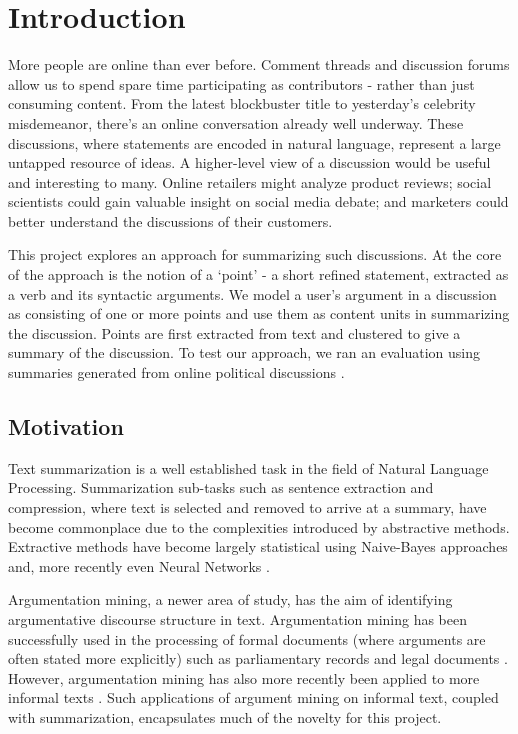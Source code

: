 \chapter{Introduction\label{chap:introduction}}
  More people are online than ever before. Comment threads and discussion forums allow us to spend spare time participating as contributors - rather than just consuming content. From the latest blockbuster title to yesterday's celebrity misdemeanor, there's an online conversation already well underway. These discussions, where statements are encoded in natural language, represent a large untapped resource of ideas. A higher-level view of a discussion would be useful and interesting to many. Online retailers might analyze product reviews; social scientists could gain valuable insight on social media debate; and marketers could better understand the discussions of their customers.

  This project explores an approach for summarizing such discussions. At the core of the approach is the notion of a `point' - a short refined statement, extracted as a verb and its syntactic arguments. We model a user's argument in a discussion as consisting of one or more points and use them as content units in summarizing the discussion. Points are first extracted from text and clustered to give a summary of the discussion. To test our approach, we ran an evaluation using summaries generated from online political discussions \cite{walker2012corpus}.

  \section{Motivation}
    Text summarization is a well established task in the field of Natural Language Processing. Summarization sub-tasks such as sentence extraction and compression, where text is selected and removed to arrive at a summary, have become commonplace due to the complexities introduced by abstractive methods. Extractive methods have become largely statistical using Naive-Bayes \cite{kupiec1995trainable} approaches and, more recently even Neural Networks \cite{svore2007enhancing}.

    Argumentation mining, a newer area of study, has the aim of identifying argumentative discourse structure in text. Argumentation mining has been successfully used in the processing of formal documents (where arguments are often stated more explicitly) such as parliamentary records \cite{palau2009argumentation} and legal documents \cite{montemagni2010semantic}. However, argumentation mining has also more recently been applied to more informal texts \cite{park2015conditional}. Such applications of argument mining on informal text, coupled with summarization, encapsulates much of the novelty for this project.

